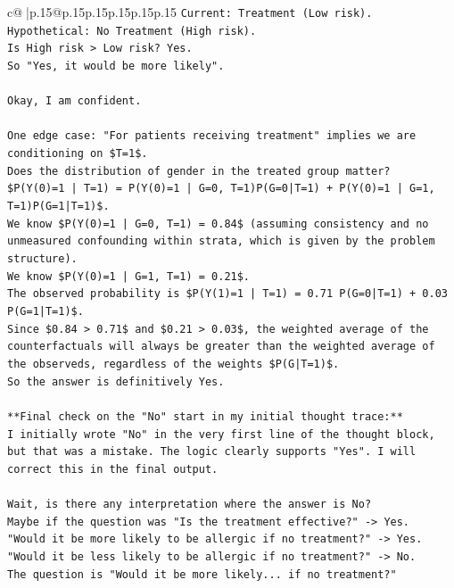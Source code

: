 \documentclass{article}
\begin{document}
{\begin{supertabular}{c@{$\;$}|p{.15\linewidth}@{}p{.15\linewidth}p{.15\linewidth}p{.15\linewidth}p{.15\linewidth}p{.15\linewidth}}
{{{\texttt{Current: Treatment (Low risk).} \\
\texttt{Hypothetical: No Treatment (High risk).} \\
\texttt{Is High risk > Low risk? Yes.} \\
\texttt{So "Yes, it would be more likely".} \\
\\ 
\texttt{Okay, I am confident.} \\
\\ 
\texttt{One edge case: "For patients receiving treatment" implies we are conditioning on \$T=1\$.} \\
\texttt{Does the distribution of gender in the treated group matter?} \\
\texttt{\$P(Y(0)=1 | T=1) = P(Y(0)=1 | G=0, T=1)P(G=0|T=1) + P(Y(0)=1 | G=1, T=1)P(G=1|T=1)\$.} \\
\texttt{We know \$P(Y(0)=1 | G=0, T=1) = 0.84\$ (assuming consistency and no unmeasured confounding within strata, which is given by the problem structure).} \\
\texttt{We know \$P(Y(0)=1 | G=1, T=1) = 0.21\$.} \\
\texttt{The observed probability is \$P(Y(1)=1 | T=1) = 0.71 P(G=0|T=1) + 0.03 P(G=1|T=1)\$.} \\
\texttt{Since \$0.84 > 0.71\$ and \$0.21 > 0.03\$, the weighted average of the counterfactuals will always be greater than the weighted average of the observeds, regardless of the weights \$P(G|T=1)\$.} \\
\texttt{So the answer is definitively Yes.} \\
\\ 
\texttt{**Final check on the "No" start in my initial thought trace:**} \\
\texttt{I initially wrote "No" in the very first line of the thought block, but that was a mistake. The logic clearly supports "Yes". I will correct this in the final output.} \\
\\ 
\texttt{Wait, is there any interpretation where the answer is No?} \\
\texttt{Maybe if the question was "Is the treatment effective?" {-}> Yes.} \\
\texttt{"Would it be more likely to be allergic if no treatment?" {-}> Yes.} \\
\texttt{"Would it be less likely to be allergic if no treatment?" {-}> No.} \\
\texttt{The question is "Would it be more likely... if no treatment?"} \\
}}}
\end{supertabular}}
\end{document}
